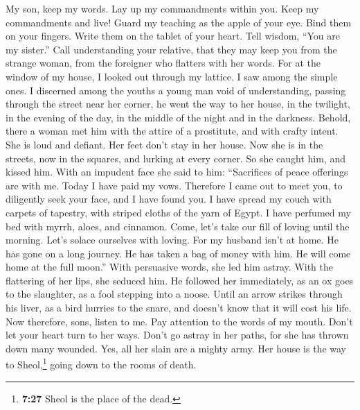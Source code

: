  My son, keep my words. Lay up my commandments within you.
 Keep my commandments and live! Guard my teaching as the
apple of your eye.  Bind them on your fingers. Write them
on the tablet of your heart.  Tell wisdom, ``You are my
sister.'' Call understanding your relative,  that they may
keep you from the strange woman, from the foreigner who flatters with
her words.  For at the window of my house, I looked out
through my lattice.  I saw among the simple ones. I
discerned among the youths a young man void of understanding,
 passing through the street near her corner, he went the
way to her house,  in the twilight, in the evening of the
day, in the middle of the night and in the darkness. 
Behold, there a woman met him with the attire of a prostitute, and with
crafty intent.  She is loud and defiant. Her feet don't
stay in her house.  Now she is in the streets, now in the
squares, and lurking at every corner.  So she caught him,
and kissed him. With an impudent face she said to him: 
``Sacrifices of peace offerings are with me. Today I have paid my vows.
 Therefore I came out to meet you, to diligently seek
your face, and I have found you.  I have spread my couch
with carpets of tapestry, with striped cloths of the yarn of Egypt.
 I have perfumed my bed with myrrh, aloes, and cinnamon.
 Come, let's take our fill of loving until the morning.
Let's solace ourselves with loving.  For my husband isn't
at home. He has gone on a long journey.  He has taken a
bag of money with him. He will come home at the full moon.''
 With persuasive words, she led him astray. With the
flattering of her lips, she seduced him.  He followed her
immediately, as an ox goes to the slaughter, as a fool stepping into a
noose.  Until an arrow strikes through his liver, as a
bird hurries to the snare, and doesn't know that it will cost his life.
 Now therefore, sons, listen to me. Pay attention to the
words of my mouth.  Don't let your heart turn to her
ways. Don't go astray in her paths,  for she has thrown
down many wounded. Yes, all her slain are a mighty army. 
Her house is the way to Sheol,\footnote{\textbf{7:27} Sheol is the place
  of the dead.} going down to the rooms of death.

